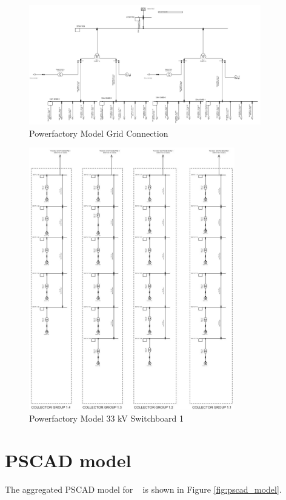 \documentclass{../grid-link-report}
\begin{document}
	\begin{figure}[H]
		\centering
		\includegraphics[width=0.9\textwidth]{report-assets/images/pf-screenshot.jpg}
		\caption{Powerfactory Model Grid Connection}
		\label{fig:powerfactory_model}
	\end{figure}
	
	\begin{figure}[H]
		\centering
		\includegraphics[width=0.8\textwidth]{report-assets/images/pf-screenshot-33.jpg}
		\caption{Powerfactory Model 33 kV Switchboard 1}
		\label{fig:powerfactory_model_33_SB}
	\end{figure}
	
	\section{PSCAD model}
	The aggregated PSCAD model for \project ~ is shown in Figure \ref{fig:pscad_model}. 
	
\end{document}
